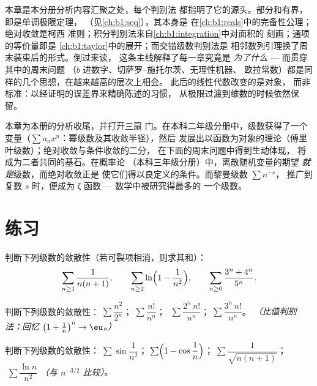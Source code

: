 \begin{remark}[回望分析学的主线]
本章是本分册分析内容汇聚之处，每个判别法
都指明了它的源头。部分和有界，即是单调极限定理，
（见\cref{ch:b1:seq}），其本身是
在\cref{ch:b1:reals}中的完备性公理；绝对收敛是柯西
准则；积分判别法来自\cref{ch:b1:integration}中对面积的
刻画；通项的等价量即是
\cref{ch:b1:taylor}中的展开；而交错级数判别法是
相邻数列引理换了周末装束后的形式。倒过来读，
这条主线解释了每一章究竟是
\emph{为了什么} --- 而贯穿其中的周末问题
（$b$ 进数字、切萨罗–施托尔茨、无理性机器、
欧拉常数）都是同样的几个思想，在越来越高的层次上相会。
此后的线性代数改变的是对象，
而非标准：以经证明的误差界来精确陈述的习惯，
从极限过渡到维数的时候依然保留。
\end{remark}

\begin{remark}[级数的下一站]
本章为本册的分析收尾，并打开三扇
门。在本科二年级分册中，级数获得了一个变量（$\sum
a_n x^n$：幂级数及其收敛半径），然后
发展出以函数为对象的理论（傅里叶级数）；绝对收敛与条件收敛的二分，
在下面的周末问题中得到生动体现，
将成为二者共同的基石。在概率论
（本科三年级分册）中，离散随机变量的期望
\emph{就是}级数，而绝对收敛正是
使它们得以良定义的条件。而黎曼级数 $\sum n^{-s}$，
推广到复数 $s$ 时，便成为 ζ 函数 --- 数学中被研究得最多的
一个级数。
\end{remark}

\section{练习}

\begin{exercise}[$\star$]\label{exo:b1:series:1}
判断下列级数的敛散性（若可裂项相消，则求其和）：
\[
\sum_{n\geq1} \frac{1}{n(n+1)},
\qquad
\sum_{n\geq2} \ln\Bigl(1 - \frac{1}{n^2}\Bigr),
\qquad
\sum_{n\geq0} \frac{3^n + 4^n}{5^n} .
\]
\end{exercise}

\begin{exercise}[$\star$]\label{exo:b1:series:2}
判断下列级数的敛散性：$\;\sum \dfrac{n^2}{2^n}$；$\;\sum \dfrac{n!}{n^n}$；
$\;\sum \dfrac{2^n\,n!}{n^n}$；$\;\sum \dfrac{3^n\,n!}{n^n}$。
\emph{（比值判别法；回忆 $\bigl(1 + \frac1n\bigr)^n \to \eu$。）}
\end{exercise}

\begin{exercise}[$\star$]\label{exo:b1:series:3}
判断下列级数的敛散性：$\;\sum \sin\dfrac{1}{n^2}$；$\;\sum
\Bigl(1 - \cos\dfrac1n\Bigr)$；$\;\sum \dfrac{1}{\sqrt{n(n+1)}}$；
$\;\sum \dfrac{\ln n}{n^2}$ \emph{（与 $n^{-3/2}$ 比较）}。
\end{exercise}


